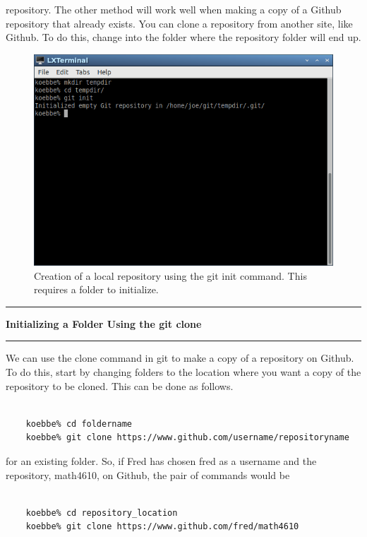 \documentclass[10pt,fleqn]{article}
\begin{document}
repository. The other method will work well when making a copy of a Github
repository that already exists. You can clone a repository from another site,
like Github. To do this, change into the folder where the repository folder will
end up.
\vfill
\begin{figure}[h]
\centering
\includegraphics[width=5.0in]{../images/git_04.png}
\vskip0.1in
\caption{Creation of a local repository using the git init command. This
requires a folder to initialize.}
\end{figure}
\eject
\vskip0.1in\hrule\vskip0.1in\noindent
{\bf Initializing a Folder Using the git clone} 
\vskip0.1in\hrule\vskip0.1in\noindent
We can use the clone command in git to make a copy of a repository on Github.
To do this, start by changing folders to the location where you want a copy of
the repository to be cloned. This can be done as follows.
\begin{verbatim}

    koebbe% cd foldername
    koebbe% git clone https://www.github.com/username/repositoryname

\end{verbatim}
for an existing folder. So, if Fred has chosen fred as a username and the
repository, math4610, on Github, the pair of commands would be
\begin{verbatim}

    koebbe% cd repository_location
    koebbe% git clone https://www.github.com/fred/math4610

\end{verbatim}
\end{document}
